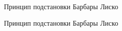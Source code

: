 \documentclass[10pt,pdf,hyperref={unicode}]{beamer}%
\begin{document}
\begin{frame}{Принцип подстановки Барбары Лиско}
\begin{figure}[h]
\end{figure}
\end{frame}


\begin{frame}{Принцип подстановки Барбары Лиско}
\begin{figure}[h]
\end{figure}
\end{frame}
\end{document}
